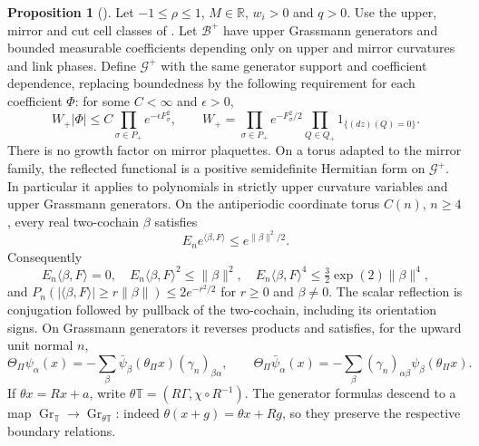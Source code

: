 \documentclass[11pt,letterpaper,reqno]{amsart}
\theoremstyle{definition}
\newtheorem{qcmproposition}{Proposition}[section]
\newenvironment{proposition}[1][]{\pushQED{\qed}\renewcommand{\qedsymbol}{$\blacksquare$}\begin{qcmproposition}[#1]}{\popQED\end{qcmproposition}}
\begin{document}
\begin{proposition}\label{qcm:lattice-reflection-domination}
Let $-1\le\rho\le1$, $M\in\mathbb R$, $w_i>0$ and $q>0$.
Use the upper, mirror and cut cell classes of
\cite[Section~2.7]{QEDConstruction}. Let $\mathcal B^+$ have upper
Grassmann generators and bounded measurable coefficients depending
only on upper and mirror curvatures and link phases. Define
$\mathcal G^+$ with the same generator support and coefficient
dependence, replacing boundedness by the following requirement for
each coefficient $\Phi$: for some $C<\infty$ and $\epsilon>0$,
\[
 W_+|\Phi|\le C\prod_{\sigma\in P_+}e^{-\epsilon F_\sigma^2},
 \qquad
 W_+=\prod_{\sigma\in P_+}e^{-F_\sigma^2/2}
                 \prod_{Q\in Q_+}1_{\{(dz)(Q)=0\}}.
\]
There is no growth factor on mirror plaquettes. On a torus adapted
to the mirror family, the reflected functional is a positive
semidefinite Hermitian form on $\mathcal G^+$. In particular it
applies to polynomials in strictly upper curvature variables and
upper Grassmann generators. On the antiperiodic coordinate torus
$C(n)$, $n\ge4$, every real two-cochain $\beta$ satisfies
\begin{equation}\label{qcm:lattice-gaussian}
 E_n e^{\langle\beta,F\rangle}\le e^{\|\beta\|^2/2}.
\end{equation}
Consequently
\begin{equation}\label{qcm:lattice-moments}
 E_n\langle\beta,F\rangle=0,\quad
 E_n\langle\beta,F\rangle^2\le\|\beta\|^2,\quad
 E_n\langle\beta,F\rangle^4\le\tfrac32\exp(2)\|\beta\|^4,
\end{equation}
and $P_n(|\langle\beta,F\rangle|\ge r\|\beta\|)
\le2e^{-r^2/2}$ for $r\ge0$ and $\beta\ne0$.
The scalar reflection is conjugation followed by pullback of the
two-cochain, including its orientation signs. On Grassmann generators
it reverses products and satisfies, for the upward unit normal $n$,
\[
 \Theta_\Pi\psi_\alpha(x)
 =-\sum_\beta\bar\psi_\beta(\theta_\Pi x)(\gamma_n)_{\beta\alpha},
 \qquad
 \Theta_\Pi\bar\psi_\alpha(x)
 =-\sum_\beta(\gamma_n)_{\alpha\beta}\psi_\beta(\theta_\Pi x).
\]
If $\theta x=Rx+a$, write
$\theta\mathbb T=(R\Gamma,\chi\circ R^{-1})$. The generator
formulas descend to a map
$\operatorname{Gr}_{\mathbb T}\to\operatorname{Gr}_{\theta\mathbb T}$:
indeed $\theta(x+g)=\theta x+Rg$, so they preserve the respective
boundary relations.
\end{proposition}
\end{document}
